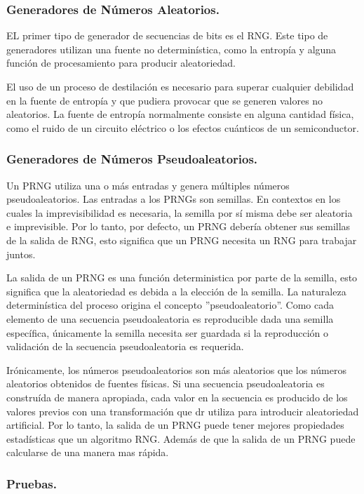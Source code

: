 \documentclass{llncs}
\theoremstyle{plane}
\begin{document}
\subsubsection{Generadores de Números Aleatorios.}
EL primer tipo de generador de secuencias de bits es el RNG. Este tipo de generadores utilizan una fuente no determinística, como la entropía y alguna función de procesamiento para producir aleatoriedad.

El uso de un proceso de destilación es necesario para superar cualquier debilidad en la fuente de entropía y que pudiera provocar que se generen valores no aleatorios. La fuente de entropía normalmente consiste en alguna cantidad física, como el ruido de un circuito eléctrico o los efectos cuánticos de un semiconductor.

\subsubsection{Generadores de Números Pseudoaleatorios.}
Un PRNG utiliza una o más entradas y genera múltiples números pseudoaleatorios. Las entradas a los PRNGs son semillas. En contextos en los cuales la imprevisibilidad es necesaria, la semilla por sí misma debe ser aleatoria e imprevisible. Por lo tanto, por defecto, un PRNG debería obtener sus semillas de la salida de RNG, esto significa que un PRNG necesita un RNG para trabajar juntos.

La salida de un PRNG es una función deterministica por parte de la semilla, esto significa que la aleatoriedad es debida a la elección de la semilla. La naturaleza determinística del proceso origina el concepto ''pseudoaleatorio''. Como cada elemento de una secuencia pseudoaleatoria es reproducible dada una semilla específica, únicamente la semilla necesita ser guardada si la reproducción o validación de la secuencia pseudoaleatoria es requerida. 

Irónicamente, los números pseudoaleatorios son más aleatorios que los números aleatorios obtenidos de fuentes físicas. Si una secuencia pseudoaleatoria es construída de manera apropiada, cada valor en la secuencia es producido de los valores previos con una transformación  que dr utiliza para introducir aleatoriedad artificial. Por lo tanto, la salida de un PRNG puede tener mejores propiedades estadísticas que un algoritmo RNG. Además de que la salida de un PRNG puede calcularse de una manera mas rápida.


\subsubsection{Pruebas.}
\end{document}
